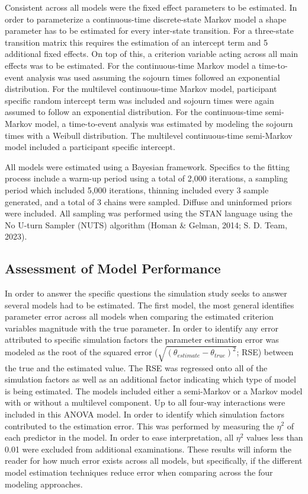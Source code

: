 \documentclass[12pt]{./styles/outhesis}
\begin{document}
Consistent across all models were the fixed effect parameters to be
estimated. In order to parameterize a continuous-time discrete-state
Markov model a shape parameter has to be estimated for every inter-state
transition. For a three-state transition matrix this requires the
estimation of an intercept term and 5 additional fixed effects. On top
of this, a criterion variable acting across all main effects was to be
estimated. For the continuous-time Markov model a time-to-event analysis
was used assuming the sojourn times followed an exponential
distribution. For the multilevel continuous-time Markov model,
participant specific random intercept term was included and sojourn
times were again assumed to follow an exponential distribution. For the
continuous-time semi-Markov model, a time-to-event analysis was
estimated by modeling the sojourn times with a Weibull distribution. The
multilevel continuous-time semi-Markov model included a participant
specific intercept.

All models were estimated using a Bayesian framework. Specifics to the
fitting process include a warm-up period using a total of 2,000
iterations, a sampling period which included 5,000 iterations, thinning
included every 3 sample generated, and a total of 3 chains were sampled.
Diffuse and uninformed priors were included. All sampling was performed
using the STAN language using the No U-turn Sampler (NUTS) algorithm
(Homan \& Gelman, 2014; S. D. Team, 2023).

\subsection{Assessment of Model Performance} \label{sec:Inference_methods}
In order to answer the specific questions the simulation study seeks to
answer several models had to be estimated. The first model, the most
general identifies parameter error across all models when comparing the
estimated criterion variables magnitude with the true parameter. In
order to identify any error attributed to specific simulation factors
the parameter estimation error was modeled as the root of the squared
error (\(\sqrt{(\theta_{estimate}-\theta_{true})^2}\); RSE) between the
true and the estimated value. The RSE was regressed onto all of the
simulation factors as well as an additional factor indicating which type
of model is being estimated. The models included either a semi-Markov or
a Markov model with or without a multilevel component. Up to all
four-way interactions were included in this ANOVA model. In order to
identify which simulation factors contributed to the estimation error.
This was performed by measuring the \(\eta^2\) of each predictor in the
model. In order to ease interpretation, all \(\eta^2\) values less than
0.01 were excluded from additional examinations. These results will
inform the reader for how much error exists across all models, but
specifically, if the different model estimation techniques reduce error
when comparing across the four modeling approaches.
\end{document}
